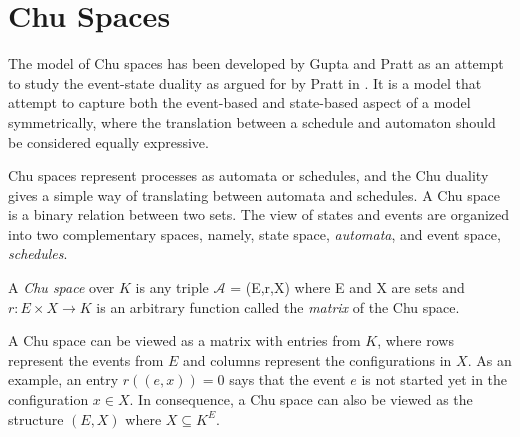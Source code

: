 \section{Chu Spaces}
\label{sec:Chu-spaces}
    The model of Chu spaces has been developed by Gupta and Pratt \cite{gupta94phd_Chu, pratt95Chu, Pratt00Sculptures} as an attempt to study the event-state duality as argued for by Pratt in \cite{Pratt02eventStateDuality}. It is a model that attempt to capture both the event-based and state-based aspect of a model symmetrically, where the translation between a schedule and automaton should be considered equally expressive.
    
    Chu spaces represent processes as automata or schedules, and the Chu duality gives a simple way of translating between automata and schedules. A Chu space is a binary relation between two sets. The view of states and events are organized into two complementary spaces, namely, state space, \emph{automata}, and event space, \emph{schedules}.
        

    \begin{definition}
        \label{def:Chu_spaces}
        A \emph{Chu space} over $K$ is any triple $\mathcal{A}$ = (E,r,X) where E and X are sets and $r: E \times X \rightarrow K$ is an arbitrary function called the \emph{matrix} of the Chu space.
    \end{definition}
    
    A Chu space can be viewed as a matrix with entries from $K$, where rows represent the events from $E$ and columns represent the configurations in $X$.  As an example, an entry $r((e,x))=0$ says that the event $e$ is not started yet in the configuration $x\in X$.  In consequence, a Chu space can also be viewed as the structure $(E,X)$ where $X\subseteq K^{E}$. %
    
